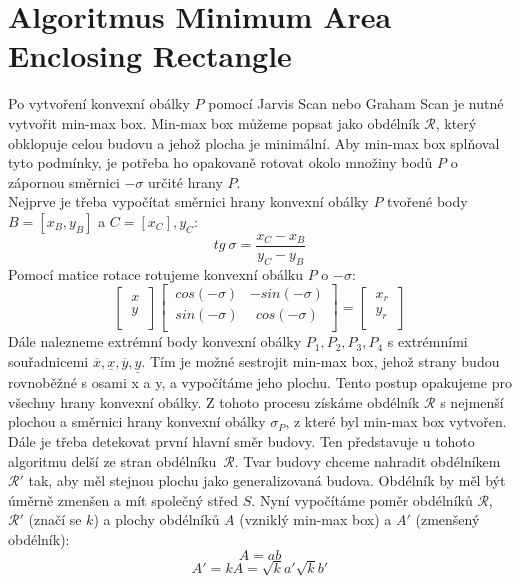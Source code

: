 \documentclass{article}
\begin{document}
\section{\small{Algoritmus Minimum Area Enclosing Rectangle}}
Po vytvoření konvexní obálky $P$ pomocí Jarvis Scan nebo Graham Scan je nutné vytvořit min-max box. Min-max box můžeme popsat jako obdélník $\mathcal{R}$, který obklopuje celou budovu a jehož plocha je minimální. Aby min-max box splňoval tyto podmínky, je potřeba ho opakovaně rotovat okolo množiny bodů $P$ o zápornou směrnici $-\sigma$ určité hrany $P$.\\
Nejprve je třeba vypočítat směrnici hrany konvexní obálky $P$ tvořené body $B = [x_{B}, y_{B}]$ a $C = [x_{C}], y_{C}$:\\
\[tg~\sigma = \frac{x_{C} - x_{B}}{y_{C} - y_{B}}\]
Pomocí matice rotace rotujeme konvexní obálku $P$ o $-\sigma$:\\
\[\begin{bmatrix}
~x~\\~y~\\
\end{bmatrix}
\begin{bmatrix}
~cos(-\sigma) & -sin(-\sigma) \\
~sin(-\sigma) & ~~cos(-\sigma)\\
\end{bmatrix}=
\begin{bmatrix}
~x_{r}~\\~y_{r}~\\
\end{bmatrix}\]
Dále nalezneme extrémní body konvexní obálky $P_{1}, P_{2}, P_{3}, P_{4}$ s extrémními souřadnicemi $\overline{x}, \underline{x}, \overline{y}, \underline{y}$. Tím je možné sestrojit min-max box, jehož strany budou rovnoběžné s osami x a y, a vypočítáme jeho plochu. Tento postup opakujeme pro všechny hrany konvexní obálky. Z tohoto procesu získáme obdélník $\mathcal{R}$ s nejmenší plochou a směrnici hrany konvexní obálky $\sigma_{P}$, z které byl min-max box vytvořen.\\
Dále je třeba detekovat první hlavní směr budovy. Ten představuje u tohoto algoritmu delší ze stran obdélníku~$\mathcal{R}$. Tvar budovy chceme nahradit obdélníkem $\mathcal{R'}$ tak, aby měl stejnou plochu jako generalizovaná budova. Obdélník by měl být úměrně zmenšen a mít společný střed $S$. 
Nyní vypočítáme poměr obdélníků $\mathcal{R}$, $\mathcal{R'}$ (značí se $k$) a plochy obdélníků $A$ (vzniklý min-max box) a $A'$ (zmenšený obdélník):
\[A = ab\]
\[A' = kA = \sqrt{k}a'\sqrt{k}b'\]
\end{document}
